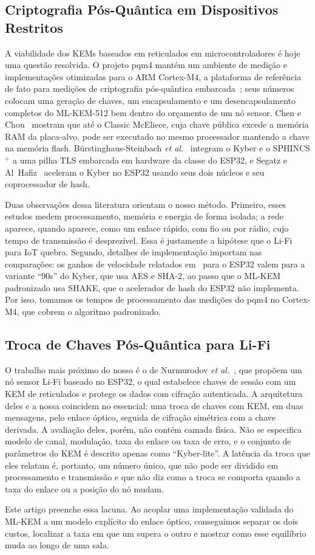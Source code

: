 \subsection{Criptografia Pós-Quântica em Dispositivos Restritos}
A viabilidade dos KEMs baseados em reticulados em microcontroladores é hoje uma
questão resolvida. O projeto pqm4 mantém um ambiente de medição e implementações
otimizadas para o ARM Cortex-M4, a plataforma de referência de fato para
medições de criptografia pós-quântica embarcada~\cite{pqm4}; seus números
colocam uma geração de chaves, um encapsulamento e um desencapsulamento
completos do ML-KEM-512 bem dentro do orçamento de um nó sensor. Chen e
Chou~\cite{chen2021mceliece} mostram que até o Classic McEliece, cuja chave
pública excede a memória RAM da placa-alvo, pode ser executado no mesmo
processador mantendo a chave na memória flash. Bürstinghaus-Steinbach
\emph{et al.}~\cite{burstinghaus2020pqm} integram o Kyber e o SPHINCS$^{+}$ a
uma pilha TLS embarcada em hardware da classe do ESP32, e Segatz e
Al~Hafiz~\cite{segatz2025kyberesp32} aceleram o Kyber no ESP32 usando seus dois
núcleos e seu coprocessador de hash.

Duas observações dessa literatura orientam o nosso método. Primeiro, esses
estudos medem processamento, memória e energia de forma isolada; a rede
aparece, quando aparece, como um enlace rápido, com fio ou por rádio, cujo
tempo de transmissão é desprezível. Essa é justamente a hipótese que o Li-Fi
para IoT quebra. Segundo, detalhes de implementação importam nas comparações:
os ganhos de velocidade relatados em~\cite{segatz2025kyberesp32} para o ESP32
valem para a variante ``90s'' do Kyber, que usa AES e SHA-2, ao passo que o
ML-KEM padronizado usa SHAKE, que o acelerador de hash do ESP32 não implementa.
Por isso, tomamos os tempos de processamento das medições do pqm4 no Cortex-M4,
que cobrem o algoritmo padronizado.

\subsection{Troca de Chaves Pós-Quântica para Li-Fi}
O trabalho mais próximo do nosso é o de Nurmurodov
\emph{et al.}~\cite{nurmurodov2025esp32}, que propõem um nó sensor Li-Fi
baseado no ESP32, o qual estabelece chaves de sessão com um KEM de reticulados
e protege os dados com cifração autenticada. A arquitetura deles e a nossa
coincidem no essencial: uma troca de chaves com KEM, em duas mensagens, pelo
enlace óptico, seguida de cifração simétrica com a chave derivada. A avaliação
deles, porém, não contém camada física. Não se especifica modelo de canal,
modulação, taxa do enlace ou taxa de erro, e o conjunto de parâmetros do KEM é
descrito apenas como ``Kyber-lite''. A latência da troca que eles relatam é,
portanto, um número único, que não pode ser dividido em processamento e
transmissão e que não diz como a troca se comporta quando a taxa do enlace ou a
posição do nó mudam.

Este artigo preenche essa lacuna. Ao acoplar uma implementação validada do
ML-KEM a um modelo explícito do enlace óptico, conseguimos separar os dois
custos, localizar a taxa em que um supera o outro e mostrar como esse
equilíbrio muda ao longo de uma sala.
